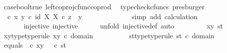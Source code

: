 \begin{isabellebody}
\ case{\isacharunderscore}{\kern0pt}bool{\isacharunderscore}{\kern0pt}true\ left{\isacharunderscore}{\kern0pt}coproj{\isacharunderscore}{\kern0pt}cfunc{\isacharunderscore}{\kern0pt}coprod\ \isamarkupfalse%
\ {\isacharparenleft}{\kern0pt}typecheck{\isacharunderscore}{\kern0pt}cfuncs{\isacharcomma}{\kern0pt}\ presburger{\isacharparenright}{\kern0pt}\isanewline
\ \ \ \ \ \ \ \ \ \ \isamarkupfalse%
\ \isamarkupfalse%
\ {\isachardoublequoteopen}{\isacharparenleft}{\kern0pt}{\isasymTheta}\ {\isasymcirc}\isactrlsub c\ {\isasymlangle}x{\isacharcomma}{\kern0pt}\ y{}{\isasymrangle}{\isacharparenright}{\kern0pt}\isactrlsup {\isasymflat}\ {\isasymcirc}\isactrlsub c\ {\isasymlangle}id\ X{\isacharcomma}{\kern0pt}\ {\isasymbeta}\isactrlbsub X\isactrlesub {\isasymrangle}\ {\isasymcirc}\isactrlsub c\ z\ {\isacharequal}{\kern0pt}\ y{}{\isachardoublequoteclose}\isanewline
\ \ \ \ \ \ \ \ \ \ \ \ \isamarkupfalse%
\ {\isacharparenleft}{\kern0pt}simp\ add{\isacharcolon}{\kern0pt}\ calculation{\isacharparenright}{\kern0pt}\isanewline
\ \ \ \ \ \ \ \ \isamarkupfalse%
\isanewline
\ \ \isanewline
\ \ \ \ \ \isamarkupfalse%
\ {\isasymTheta}{\isacharunderscore}{\kern0pt}injective{\isacharcolon}{\kern0pt}\ {\isachardoublequoteopen}injective{\isacharparenleft}{\kern0pt}{\isasymTheta}{\isacharparenright}{\kern0pt}{\isachardoublequoteclose}\isanewline
\ \ \ \ \ \isamarkupfalse%
{\isacharparenleft}{\kern0pt}unfold\ injective{\isacharunderscore}{\kern0pt}def{\isacharcomma}{\kern0pt}\ auto{\isacharparenright}{\kern0pt}\isanewline
\ \ \ \ \ \ \ \isamarkupfalse%
\ xy\ st\isanewline
\ \ \ \ \ \ \ \isamarkupfalse%
\ xy{\isacharunderscore}{\kern0pt}type{\isacharbrackleft}{\kern0pt}type{\isacharunderscore}{\kern0pt}rule{\isacharbrackright}{\kern0pt}{\isacharcolon}{\kern0pt}\ {\isachardoublequoteopen}xy\ {\isasymin}\isactrlsub c\ domain\ {\isasymTheta}{\isachardoublequoteclose}\isanewline
\ \ \ \ \ \ \ \isamarkupfalse%
\ st{\isacharunderscore}{\kern0pt}type{\isacharbrackleft}{\kern0pt}type{\isacharunderscore}{\kern0pt}rule{\isacharbrackright}{\kern0pt}{\isacharcolon}{\kern0pt}\ {\isachardoublequoteopen}st\ {\isasymin}\isactrlsub c\ domain\ {\isasymTheta}{\isachardoublequoteclose}\isanewline
\ \ \ \ \ \ \ \isamarkupfalse%
\ equals{\isacharcolon}{\kern0pt}\ {\isachardoublequoteopen}{\isasymTheta}\ {\isasymcirc}\isactrlsub c\ xy\ {\isacharequal}{\kern0pt}\ {\isasymTheta}\ {\isasymcirc}\isactrlsub c\ st{\isachardoublequoteclose}\isanewline

\end{isabellebody}
